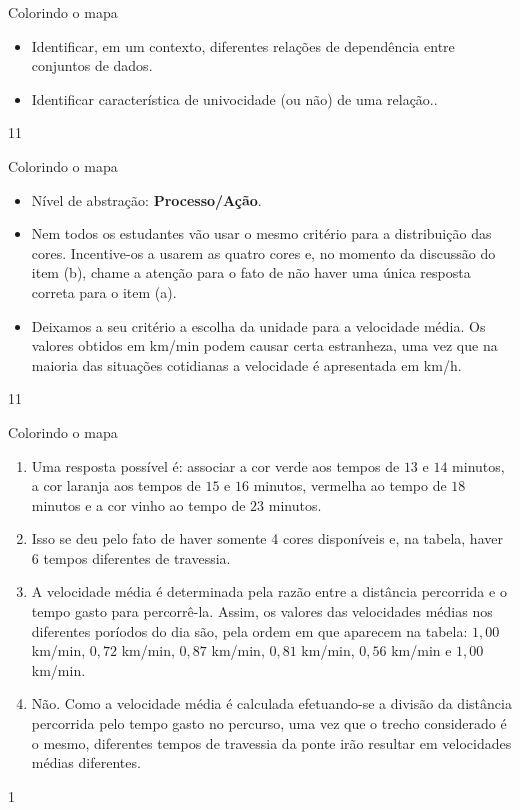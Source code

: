 \def\currentcolor{session2}
\begin{objectives}{Colorindo o mapa}
{
\begin{itemize}

\item Identificar, em um contexto, diferentes relações de dependência entre conjuntos de dados.

\item Identificar característica de univocidade (ou não) de uma relação..

\end{itemize}
}{1}{1}
\end{objectives}
\begin{sugestions}{Colorindo o mapa}
{
\begin{itemize}
\item Nível de abstração: \textbf{Processo/Ação}.

\item Nem todos os estudantes vão usar o mesmo critério para a distribuição das cores. Incentive-os a usarem as quatro cores e, no momento da discussão do item (b), chame a atenção para o fato de não haver uma única resposta correta para o item (a).

\item Deixamos a seu critério a escolha da unidade para a velocidade média. Os valores obtidos em km/min podem causar certa estranheza, uma vez que na maioria das situações cotidianas a velocidade é apresentada em km/h.

\end{itemize}
}{1}{1}
\end{sugestions}
\clearmargin
\begin{answer}{Colorindo o mapa}
{
\begin{enumerate}
\item {} 
Uma resposta possível é: associar a cor verde aos tempos de $13$ e $14$ minutos, a cor laranja aos tempos de $15$ e $16$ minutos, vermelha ao tempo de $18$ minutos e a cor vinho ao tempo de $23$ minutos.
\item {} 
Isso se deu pelo fato de haver somente 4 cores disponíveis e, na tabela, haver 6 tempos diferentes de travessia.

\item {} 
A velocidade média é determinada pela razão entre a distância percorrida e o tempo gasto para percorrê-la. Assim, os valores das velocidades médias nos diferentes poríodos do dia são, pela ordem em que aparecem na tabela: $1{,}00$ km/min, $0{,}72$ km/min, $0{,}87$ km/min, $0{,}81$ km/min, $0{,}56$ km/min e $1{,}00$ km/min.

\item {} 
Não. Como a velocidade média é calculada efetuando-se a divisão da distância percorrida pelo tempo gasto no percurso, uma vez que o trecho considerado é o mesmo, diferentes tempos de travessia da ponte irão resultar em velocidades médias diferentes.

\end{enumerate}
}{1}
\end{answer}
